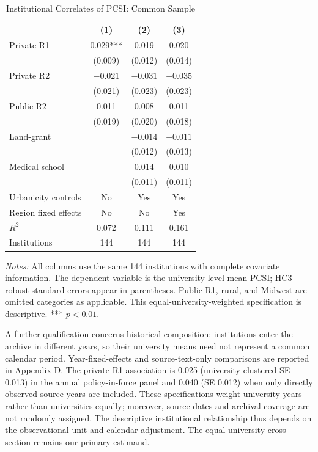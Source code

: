 \documentclass[11pt]{article}
\begin{document}
\begin{table}[htbp]\centering\caption{Institutional Correlates of PCSI: Common Sample}\label{tab:instreg}\small\begin{tabular}{lccc}\toprule &(1)&(2)&(3)\\\midrule
Private R1&0.029***&0.019&0.020\\&(0.009)&(0.012)&(0.014)\\Private R2&$-0.021$&$-0.031$&$-0.035$\\&(0.021)&(0.023)&(0.023)\\Public R2&0.011&0.008&0.011\\&(0.019)&(0.020)&(0.018)\\Land-grant& & $-0.014$&$-0.011$\\& &(0.012)&(0.013)\\Medical school& &0.014&0.010\\& &(0.011)&(0.011)\\Urbanicity controls&No&Yes&Yes\\Region fixed effects&No&No&Yes\\$R^2$&0.072&0.111&0.161\\Institutions&144&144&144\\\bottomrule\end{tabular}
\par\smallskip\begin{minipage}{.89\linewidth}\footnotesize\emph{Notes:} All columns use the same 144 institutions with complete covariate information. The dependent variable is the university-level mean PCSI; HC3 robust standard errors appear in parentheses. Public R1, rural, and Midwest are omitted categories as applicable. This equal-university-weighted specification is descriptive. *** $p<0.01$.\end{minipage}\end{table}

A further qualification concerns historical composition: institutions enter the archive in different years, so their university means need not represent a common calendar period. Year-fixed-effects and source-text-only comparisons are reported in Appendix D. The private-R1 association is 0.025 (university-clustered SE 0.013) in the annual policy-in-force panel and 0.040 (SE 0.012) when only directly observed source years are included. These specifications weight university-years rather than universities equally; moreover, source dates and archival coverage are not randomly assigned. The descriptive institutional relationship thus depends on the observational unit and calendar adjustment. The equal-university cross-section remains our primary estimand.
\end{document}
